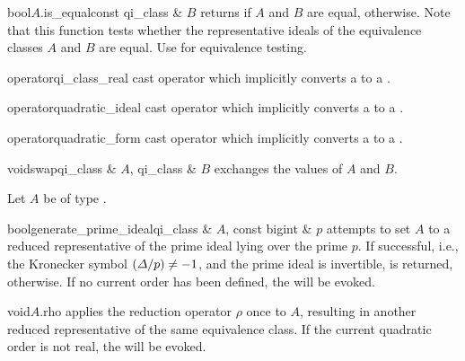 \begin{cfcode}{bool}{$A$.is_equal}{const qi_class & $B$}
  returns \TRUE if $A$ and $B$ are equal, \FALSE otherwise.  Note that this function tests
  whether the representative ideals of the equivalence classes $A$ and $B$ are equal.  Use
   for equivalence testing.
\end{cfcode}



\BASIC

\begin{cfcode}{operator}{qi_class_real}{}
  cast operator which implicitly converts a  to a .
\end{cfcode}

\begin{cfcode}{operator}{quadratic_ideal}{}
  cast operator which implicitly converts a  to a .
\end{cfcode}

\begin{cfcode}{operator}{quadratic_form}{}
  cast operator which implicitly converts a  to a .
\end{cfcode}

\begin{fcode}{void}{swap}{qi_class & $A$, qi_class & $B$}
  exchanges the values of $A$ and $B$.
\end{fcode}



\HIGH

Let $A$ be of type .

\begin{fcode}{bool}{generate_prime_ideal}{qi_class & $A$, const bigint & $p$}
  attempts to set $A$ to a reduced representative of the prime ideal lying over the prime $p$.
  If successful, i.e., the Kronecker symbol $(\varDelta/p) \neq -1$, and the prime ideal is invertible,
  \TRUE is returned, \FALSE otherwise.  If no current order has been defined, the \LEH will be
  evoked.
\end{fcode}




\begin{fcode}{void}{$A$.rho}{}
  applies the reduction operator $\rho$ once to $A$, resulting in another reduced representative
  of the same equivalence class.  If the current quadratic order is not real, the \LEH will be
  evoked.
\end{fcode}


